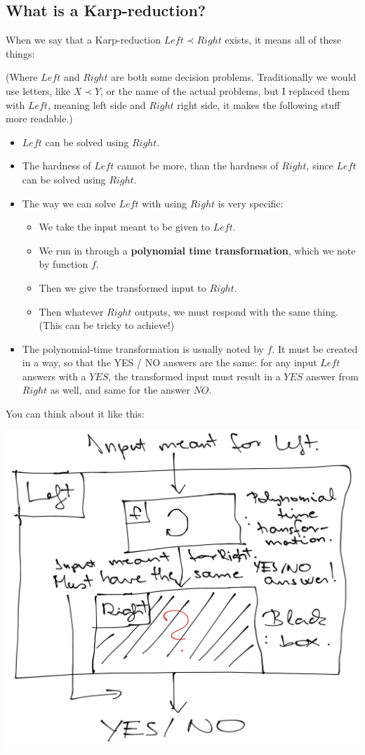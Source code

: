 \subsection{What is a Karp-reduction?}
\label{karpwhat}

When we say that a Karp-reduction $Left \prec Right$ exists, it means all of these things:

(Where $Left$ and $Right$ are both some decision problems. Traditionally we would use letters, like $X \prec Y$, or the name of the actual problems, but I replaced them with $Left$, meaning left side and $Right$ right side, it makes the following stuff more readable.)

\begin{itemize}
    \item $Left$ can be solved using $Right$.
    \item The hardness of $Left$ cannot be more, than the hardness of $Right$, since $Left$ can be solved using $Right$.
    \item The way we can solve $Left$ with using $Right$ is very specific:
    \begin{itemize}
        \item We take the input meant to be given to $Left$.
        \item We run in through a \textbf{polynomial time transformation}, which we note by function $f$.
        \item Then we give the transformed input to $Right$.
        \item Then whatever $Right$ outputs, we must respond with the same thing. (This can be tricky to achieve!)
    \end{itemize}
    \item The polynomial-time transformation is usually noted by $f$. It must be created in a way, so that the YES / NO answers are the same: for any input $Left$ answers with a $YES$, the transformed input must result in a $YES$ answer from $Right$ as well, and same for the answer $NO$.
\end{itemize}

You can think about it like this:

\begin{center}
    \includegraphics[width=0.8\linewidth]{08/01/karp_reduction.png}
\end{center}

